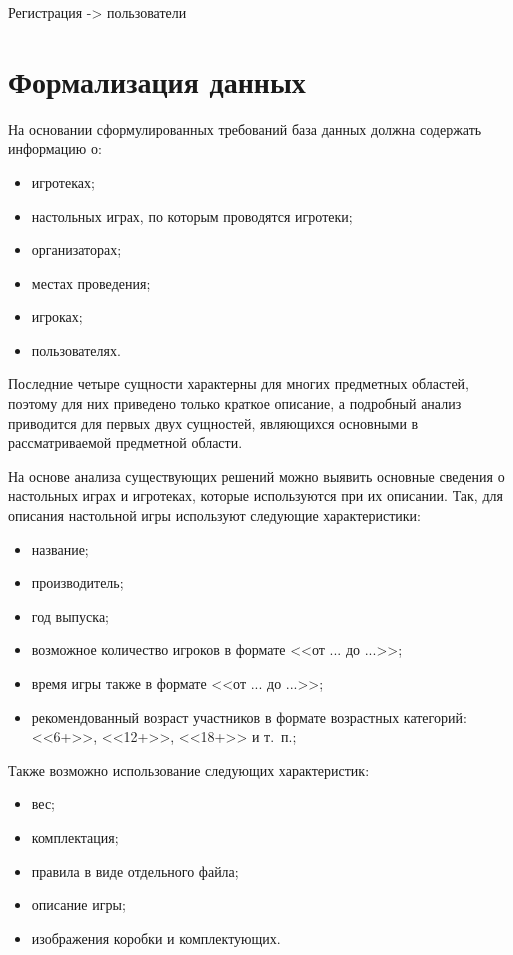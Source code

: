 Регистрация -> пользователи


\section{Формализация данных}

На основании сформулированных требований база данных должна содержать информацию
о:

\begin{itemize}
    \item игротеках;
    \item настольных играх, по которым проводятся игротеки;
    \item организаторах;
    \item местах проведения;
    \item игроках;
    \item пользователях.
\end{itemize}

Последние четыре сущности характерны для многих предметных областей, поэтому для
них приведено только краткое описание, а подробный анализ приводится для первых
двух сущностей, являющихся основными в рассматриваемой предметной области.

На основе анализа существующих решений можно выявить основные сведения о
настольных играх и игротеках, которые используются при их описании. Так, для
описания настольной игры используют следующие характеристики:

\begin{itemize}
    \item название;
    \item производитель;
    \item год выпуска;
    \item возможное количество игроков в формате <<от ... до ...>>;
    \item время игры также в формате <<от ... до ...>>;
    \item рекомендованный возраст участников в формате возрастных категорий:
        <<6+>>, <<12+>>, <<18+>> и т.~п.;
\end{itemize}

Также возможно использование следующих характеристик:
\begin{itemize}
    \item вес;
    \item комплектация;
    \item правила в виде отдельного файла;
    \item описание игры;
    \item изображения коробки и комплектующих.
\end{itemize}

